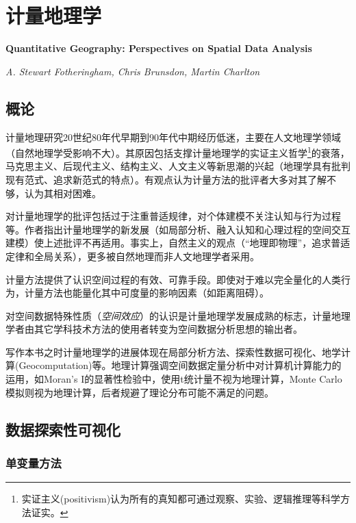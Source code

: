 
\chapter{计量地理学}
\Large\textbf{Quantitative Geography: Perspectives on Spatial Data Analysis}
\par \emph{A. Stewart Fotheringham, Chris Brunsdon, Martin Charlton} \normalsize

\section{概论}
\par 计量地理研究20世纪80年代早期到90年代中期经历低迷，主要在人文地理学领域（自然地理学受影响不大）。其原因包括支撑计量地理学的实证主义哲学\footnote{实证主义(positivism)认为所有的真知都可通过观察、实验、逻辑推理等科学方法证实。}的衰落，马克思主义、后现代主义、结构主义、人文主义等新思潮的兴起（地理学具有批判现有范式、追求新范式的特点）。有观点认为计量方法的批评者大多对其了解不够，认为其相对困难。

\par 对计量地理学的批评包括过于注重普适规律，对个体建模不关注认知与行为过程等。作者指出计量地理学的新发展（如局部分析、融入认知和心理过程的空间交互建模）使上述批评不再适用。事实上，自然主义的观点（“地理即物理”，追求普适定律和全局关系），更多被自然地理而非人文地理学者采用。

\par 计量方法提供了认识空间过程的有效、可靠手段。即使对于难以完全量化的人类行为，计量方法也能量化其中可度量的影响因素（如距离阻碍）。

\par 对空间数据特殊性质（\emph{空间效应}）的认识是计量地理学发展成熟的标志，计量地理学者由其它学科技术方法的使用者转变为空间数据分析思想的输出者。

\par 写作本书之时计量地理学的进展体现在局部分析方法、探索性数据可视化、地学计算(Geocomputation)等。地理计算强调空间数据定量分析中对计算机计算能力的运用，如Moran's I的显著性检验中，使用t统计量不视为地理计算，Monte Carlo模拟则视为地理计算，后者规避了理论分布可能不满足的问题。

\section{数据探索性可视化}

\subsection{单变量方法}

